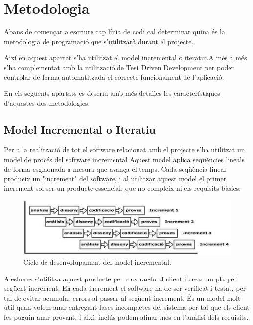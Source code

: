 \chapter{Metodologia}
\label{chap:metodologia}

Abans de començar a escriure cap línia de codi cal determinar quina és la metodologia de programació que s'utilitzarà durant el projecte. 

Així en aquest apartat s'ha utilitzat el model incremental o iteratiu.A més a més s'ha complementat amb la utilització de Test Driven Development per poder controlar de forma automatitzada el correcte funcionament de l'aplicació.

En els següents apartats es descriu amb més detalles les característiques d'aquestes dos metodologies.  


\section{Model Incremental o Iteratiu}

Per a la realització de tot el software relacionat amb el projecte s’ha utilitzat un model de procés del software incremental Aquest model aplica seqüències lineals de forma esglaonada a mesura que avança el temps. Cada seqüència lineal produeix un "increment" del software, i al utilitzar aquest model el primer increment sol ser un producte essencial, que no compleix ni els requisits bàsics.

\begin{figure}[htbp]
\centering\includegraphics{img/model-incremental.png}
\caption{Cicle de desenvolupament del model incremental.}
\label{fig:mii}
\end{figure} 


Aleshores s’utilitza aquest producte per mostrar-lo al client i crear un pla pel següent increment. En cada increment el software ha de ser verificat i testat, per tal de evitar acumular errors al passar al següent increment. És un model molt útil quan volem anar entregant fases incompletes del sistema per tal que els client les puguin anar provant, i així, inclús podem afinar més en l’anàlisi dels requisits.

